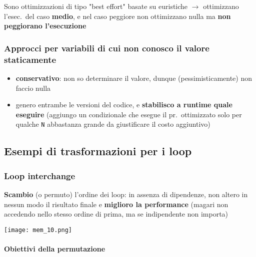 \begin{emphasize}
  Sono ottimizzazioni di tipo "best effort" basate su euristiche $\rightarrow$ ottimizzano l'esec.~del caso \textbf{medio}, e nel caso peggiore non ottimizzano nulla ma \textbf{non peggiorano l'esecuzione}
\end{emphasize}

\subsubsection{Approcci per variabili di cui non conosco il valore staticamente}
\begin{itemize}
    \item \textbf{conservativo}: non so determinare il valore, dunque (pessimisticamente) non faccio nulla
    \item genero entrambe le versioni del codice, e \textbf{stabilisco a runtime quale eseguire} (aggiungo un condizionale che esegue il pr.~ottimizzato solo per qualche \lstinline|N| abbastanza grande da giustificare il costo aggiuntivo)
  \end{itemize}


\subsection{Esempi di trasformazioni per i loop}

\subsubsection{Loop interchange}

\noindent\begin{minipage}[c]{.45\textwidth}
\textbf{Scambio} (o permuto) l'ordine dei loop: in assenza di dipendenze, non altero in nessun modo il risultato finale e \textbf{miglioro la performance} (magari non accedendo nello stesso ordine di prima, ma se indipendente non importa)
\end{minipage}\hfill
\begin{minipage}[c]{.5\textwidth}
\texttt{[image: mem\_10.png]}
\end{minipage}


\paragraph{Obiettivi della permutazione}

